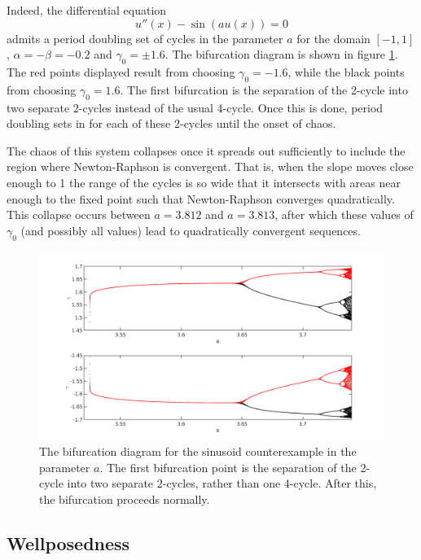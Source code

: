 \documentclass{article}
\begin{document}
Indeed, the differential equation
\begin{equation} \label{eq:sin}
u''(x) - \sin \left ( a u(x) \right ) = 0
\end{equation}
admits a period doubling set of cycles in the parameter $a$ for the domain $[-1,1]$, $\alpha = -\beta = -0.2$ and $\gamma_0 = \pm 1.6$.
The bifurcation diagram is shown in figure \ref{fig:bifurc}.
The red points displayed result from choosing $\gamma_0 = -1.6$, while the black points from choosing $\gamma_0 = 1.6$.
The first bifurcation is the separation of the 2-cycle into two separate 2-cycles instead of the usual 4-cycle.
Once this is done, period doubling sets in for each of these 2-cycles until the onset of chaos.

The chaos of this system collapses once it spreads out sufficiently to include the region where Newton-Raphson is convergent.
That is, when the slope moves close enough to 1 the range of the cycles is so wide that it intersects with areas near enough to the fixed point such that Newton-Raphson converges quadratically.
This collapse occurs between $a = 3.812$ and $a=3.813$, after which these values of $\gamma_0$ (and possibly all values) lead to quadratically convergent sequences.

\begin{figure}
\includegraphics[width=\textwidth]{bifurcation_all.png}
\caption{The bifurcation diagram for the sinusoid counterexample in the parameter $a$.
The first bifurcation point is the separation of the 2-cycle into two separate 2-cycles, rather than one 4-cycle.
After this, the bifurcation proceeds normally.}
\label{fig:bifurc}
\end{figure}

\subsection{Wellposedness}
\end{document}
